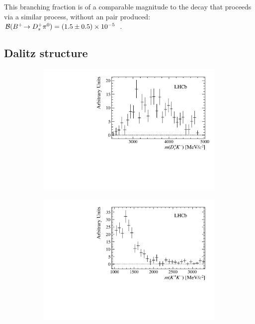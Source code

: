 This branching fraction is of a comparable magnitude to the decay \decay{\Bp}{\Dsp\piz} that proceeds via a similar process, without an \squark\squarkbar pair produced: $\mathcal{B}({{{B}^+}}\!\rightarrow {\ensuremath{{D}^+_{s}}} {\ensuremath{{\pi}^0}}) = (1.5 \pm 0.5) \times 10^{-5}$~\cite{Aubert:2006xy}.  

\subsection{Dalitz structure}


\begin{figure}[!h]
    \centering
    \begin{subfigure}[t]{0.49\textwidth}
        \includegraphics[width=1.0\textwidth]{figs/B2DsKK/DsKm_mass_sweighted.pdf}
    \end{subfigure}
    \begin{subfigure}[t]{0.49\textwidth}
        \includegraphics[width=1.0\textwidth]{figs/B2DsKK/phi_mass_sweighted.pdf}

\end{subfigure}
\end{figure}
